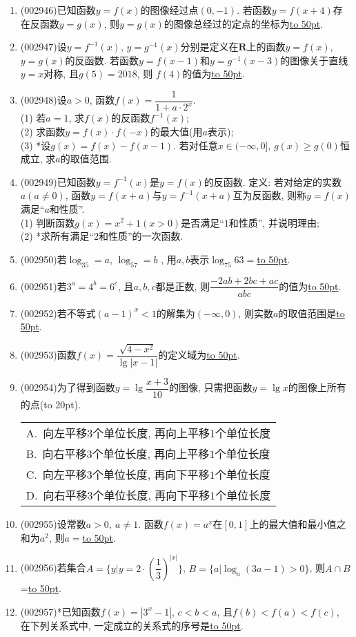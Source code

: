 \documentclass[10pt,a4paper]{article}
\newcommand{\blank}[1]{\underline{\hbox to #1pt{}}}
\newcommand{\bracket}[1]{(\hbox to #1pt{})}
\newcommand{\onech}[4]{\par\begin{tabular}{p{.9\textwidth}}
A.~#1\\
B.~#2\\
C.~#3\\
D.~#4
\end{tabular}}
\begin{document}
\begin{enumerate}[1.]
\item {\tiny (002946)}已知函数$y=f(x)$的图像经过点$(0,-1)$. 若函数$y=f(x+4)$存在反函数$y=g(x)$, 则$y=g(x)$的图像总经过的定点的坐标为\blank{50}.
\item {\tiny (002947)}设$y=f^{-1}(x)$, $y=g^{-1}(x)$分别是定义在$\mathbf{R}$上的函数$y=f(x)$, $y=g(x)$的反函数. 若函数$y=f(x-1)$和$y=g^{-1}(x-3)$的图像关于直线$y=x$对称, 且$g(5)=2018$, 则 $f(4)$的值为\blank{50}.
\item {\tiny (002948)}设$a>0$, 函数$f(x)=\dfrac 1{1+a\cdot 2^x}$.\\
(1) 若$a=1$, 求$f(x)$的反函数$f^{-1}(x)$;\\
(2) 求函数$y=f(x)\cdot f(-x)$的最大值(用$a$表示);\\
(3) *设$g(x)=f(x)-f(x-1)$. 若对任意$x\in (-\infty ,0]$, $g(x)\ge g(0)$恒成立, 求$a$的取值范围.
\item {\tiny (002949)}已知函数$y=f^{-1}(x)$是$y=f(x)$的反函数. 定义: 若对给定的实数$a(a\ne 0)$, 函数$y=f(x+a)$与$y=f^{-1}(x+a)$互为反函数, 则称$y=f(x)$满足``$a$和性质''.\\
(1) 判断函数$g(x)=x^2+1(x>0)$是否满足``$1$和性质'', 并说明理由;\\
(2) *求所有满足``$2$和性质''的一次函数.
\item {\tiny (002950)}若$\log_35=a$, $\log_57=b$ , 用$a,b$表示$\log_{75}63=$\blank{50}.
\item {\tiny (002951)}若$3^a=4^b=6^c$, 且$a,b,c$都是正数, 则$\dfrac{-2ab+2bc+ac}{abc}$的值为\blank{50}.
\item {\tiny (002952)}若不等式$(a-1)^x<1$的解集为$(-\infty,0)$, 则实数$a$的取值范围是\blank{50}.
\item {\tiny (002953)}函数$f(x)=\dfrac{\sqrt{4-x^2}}{\lg |x-1|}$的定义域为\blank{50}.
\item {\tiny (002954)}为了得到函数$y=\lg\dfrac{x+3}{10}$的图像, 只需把函数$y=\lg x$的图像上所有的点\bracket{20}.
\onech{向左平移$3$个单位长度, 再向上平移$1$个单位长度}{向右平移$3$个单位长度, 再向上平移$1$个单位长度}{向左平移$3$个单位长度, 再向下平移$1$个单位长度}{向右平移$3$个单位长度, 再向下平移$1$个单位长度}
\item {\tiny (002955)}设常数$a>0,\ a\ne 1$. 函数$f(x)=a^x$在$[0,1]$上的最大值和最小值之和为$a^2$, 则$a=$\blank{50}.
\item {\tiny (002956)}若集合$A=\{y|y=2\cdot (\dfrac 13)^{|x|}\}$, $B=\{ a|\log_a(3a-1)>0\}$, 则$A\cap B$=\blank{50}.
\item {\tiny (002957)}*已知函数$f(x)=|3^x-1|$, $c<b<a$, 且$f(b)<f(a)<f(c)$, 在下列关系式中, 一定成立的关系式的序号是\blank{50}.

\end{enumerate}
\end{document}
